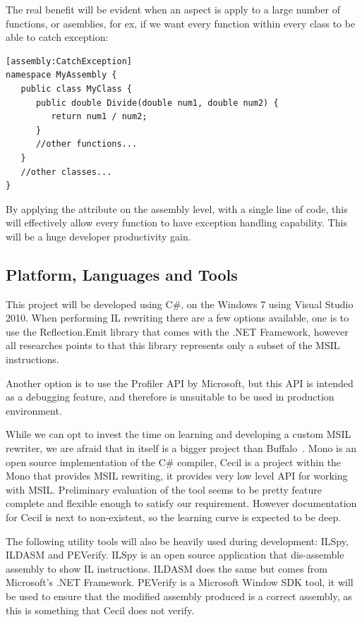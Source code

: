 The real benefit will be evident when an aspect is apply to a large number of functions, or asemblies, for ex, if we want every function within every class to be able to catch exception:

\begin{lstlisting}[caption={applying Buffalo aspect on an assembly}, label=applybuffaloassembly]
[assembly:CatchException]
namespace MyAssembly {
   public class MyClass {
      public double Divide(double num1, double num2) {
         return num1 / num2;
      }
      //other functions...
   }
   //other classes...
}
\end{lstlisting}

By applying the attribute on the assembly level, with a single line of code, this will effectively allow every function to have exception handling capability. This will be a huge developer productivity gain.

\subsection{Platform, Languages and Tools}
This project will be developed using C\#, on the Windows 7 using Visual Studio 2010. When performing IL rewriting there are a few options available, one is to use the Reflection.Emit library that comes with the .NET Framework, however all researches points to that this library represents only a subset of the MSIL instructions.

Another option is to use the Profiler API by Microsoft, but this API is intended as a debugging feature, and therefore is unsuitable to be used in production environment.

While we can opt to invest the time on learning and developing a custom MSIL rewriter, we are afraid that in itself is a bigger project than Buffalo~\cite{msil_text}. Mono is an open source implementation of the C\# compiler, Cecil is a project within the Mono that provides MSIL rewriting, it provides very low level API for working with MSIL. Preliminary evaluation of the tool seems to be pretty feature complete and flexible enough to satisfy our requirement. However documentation for Cecil is next to non-existent, so the learning curve is expected to be deep.

The following utility tools will also be heavily used during development: ILSpy, ILDASM and PEVerify. ILSpy is an open source application that dis-assemble assembly to show IL instructions. ILDASM does the same but comes from Microsoft’s .NET Framework. PEVerify is a Microsoft Window SDK tool, it will be used to ensure that the modified assembly produced is a correct assembly, as this is something that Cecil does not verify.

